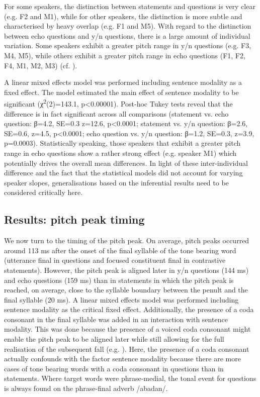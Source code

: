 \newpage 
For some speakers, the distinction between statements and questions is very clear (e.g. F2 and M1), while for other speakers, the distinction is more subtle and characterised by heavy overlap (e.g. F1 and M5). With regard to the distinction between echo questions and y/n questions, there is a large amount of individual variation. Some speakers exhibit a greater pitch range in y/n questions (e.g. F3, M4, M5), while others exhibit a greater pitch range in echo questions (F1, F2, F4, M1, M2, M3) (cf. ).

A linear mixed effects model was performed including sentence modality as a fixed effect. The model estimated the main effect of sentence modality to be significant (χ\textsuperscript{2}(2)=143.1, p<0.00001). Post-hoc Tukey tests reveal that the difference is in fact significant across all comparisons (statement vs. echo question: β=4.2, SE=0.3 z=12.6, p<0.0001; statement vs. y/n question: β=2.6, SE=0.6, z=4.5, p<0.0001; echo question vs. y/n question: β=1.2, SE=0.3, z=3.9, p=0.0003). Statistically speaking, those speakers that exhibit a greater pitch range in echo questions show a rather strong effect (e.g. speaker M1) which potentially drives the overall mean differences. In light of these inter-individual difference and the fact that the statistical models did not account for varying speaker slopes, generalisations based on the inferential results need to be considered critically here.

\subsection{Results: pitch peak timing}
We now turn to the timing of the pitch peak. On average, pitch peaks occurred around 113 ms after the onset of the final syllable of the tone bearing word (utterance final in questions and focused constituent final in contrastive statements). However, the pitch peak is aligned later in y/n questions (144 ms) and echo questions (159 ms) than in statements in which the pitch peak is reached, on average, close to the syllable boundary between the penult and the final syllable (20 ms). A linear mixed effects model was performed including sentence modality as the critical fixed effect. Additionally, the presence of a coda consonant in the final syllable was added in an interaction with sentence modality. This was done because the presence of a voiced coda consonant might enable the pitch peak to be aligned later while still allowing for the full realisation of the subsequent fall (e.g. \citealt{Muecke.etal2009,NiemannMuecke2015}). Here, the presence of a coda consonant actually confounds with the factor sentence modality because there are more cases of tone bearing words with a coda consonant in questions than in statements. Where target words were phrase-medial, the tonal event for questions is always found on the phrase-final adverb /abadan/.

